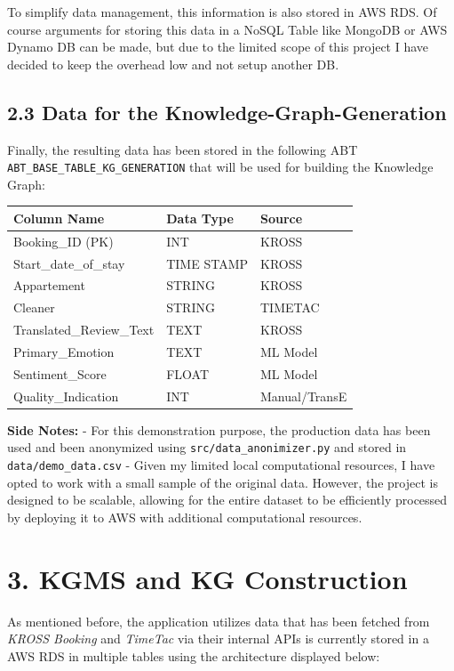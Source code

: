 \documentclass[
]{article}
\begin{document}
To simplify data management, this information is also stored in AWS RDS.
Of course arguments for storing this data in a NoSQL Table like MongoDB
or AWS Dynamo DB can be made, but due to the limited scope of this
project I have decided to keep the overhead low and not setup another
DB.

\subsection{2.3 Data for the
Knowledge-Graph-Generation}\label{data-for-the-knowledge-graph-generation}

Finally, the resulting data has been stored in the following ABT
\texttt{ABT\_BASE\_TABLE\_KG\_GENERATION} that will be used for building
the Knowledge Graph:

\begin{longtable}[]{@{}lll@{}}
\toprule\noalign{}
Column Name & Data Type & Source \\
\midrule\noalign{}
\endhead
\bottomrule\noalign{}
\endlastfoot
Booking\_ID (PK) & INT & KROSS \\
Start\_date\_of\_stay & TIME STAMP & KROSS \\
Appartement & STRING & KROSS \\
Cleaner & STRING & TIMETAC \\
Translated\_Review\_Text & TEXT & KROSS \\
Primary\_Emotion & TEXT & ML Model \\
Sentiment\_Score & FLOAT & ML Model \\
Quality\_Indication & INT & Manual/TransE \\
\end{longtable}

\textbf{Side Notes:} - For this demonstration purpose, the production
data has been used and been anonymized using
\texttt{src/data\_anonimizer.py} and stored in
\texttt{data/demo\_data.csv} - Given my limited local computational
resources, I have opted to work with a small sample of the original
data. However, the project is designed to be scalable, allowing for the
entire dataset to be efficiently processed by deploying it to AWS with
additional computational resources.

\section{3. KGMS and KG Construction}\label{kgms-and-kg-construction}

As mentioned before, the application utilizes data that has been fetched
from \emph{KROSS Booking} and \emph{TimeTac} via their internal APIs is
currently stored in a AWS RDS in multiple tables using the architecture
displayed below:
\end{document}
